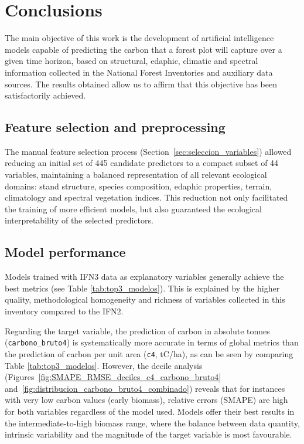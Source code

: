 \section{Conclusions}
\label{sec:conclusiones}

The main objective of this work is the development of artificial intelligence models capable of predicting the carbon that a forest plot will capture over a given time horizon, based on structural, edaphic, climatic and spectral information collected in the National Forest Inventories and auxiliary data sources. The results obtained allow us to affirm that this objective has been satisfactorily achieved.

\subsection*{Feature selection and preprocessing}

The manual feature selection process (Section~\ref{sec:seleccion_variables}) allowed reducing an initial set of 445 candidate predictors to a compact subset of 44 variables, maintaining a balanced representation of all relevant ecological domains: stand structure, species composition, edaphic properties, terrain, climatology and spectral vegetation indices. This reduction not only facilitated the training of more efficient models, but also guaranteed the ecological interpretability of the selected predictors.

\subsection*{Model performance}

Models trained with IFN3 data as explanatory variables generally achieve the best metrics (see Table \ref{tab:top3_modelos}). This is explained by the higher quality, methodological homogeneity and richness of variables collected in this inventory compared to the IFN2.

Regarding the target variable, the prediction of carbon in absolute tonnes (\texttt{carbono\_bruto4}) is systematically more accurate in terms of global metrics than the prediction of carbon per unit area (\texttt{c4}, tC/ha), as can be seen by comparing Table \ref{tab:top3_modelos}. However, the decile analysis (Figures~\ref{fig:SMAPE_RMSE_deciles_c4_carbono_bruto4} and~\ref{fig:distribucion_carbono_bruto4_combinado}) reveals that for instances with very low carbon values (early biomass), relative errors (SMAPE) are high for both variables regardless of the model used. Models offer their best results in the intermediate-to-high biomass range, where the balance between data quantity, intrinsic variability and the magnitude of the target variable is most favourable.

